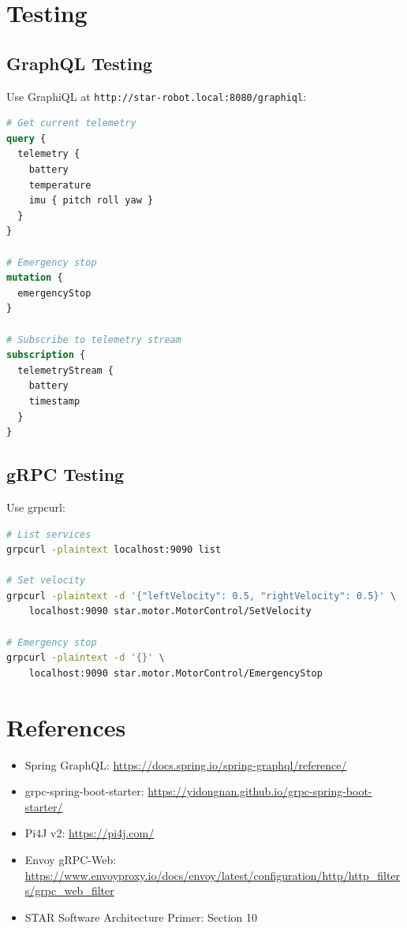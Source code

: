 \section{Testing}

\subsection{GraphQL Testing}

Use GraphiQL at \texttt{http://star-robot.local:8080/graphiql}:

\begin{lstlisting}[language=GraphQL, caption=Sample GraphQL Queries]
# Get current telemetry
query {
  telemetry {
    battery
    temperature
    imu { pitch roll yaw }
  }
}

# Emergency stop
mutation {
  emergencyStop
}

# Subscribe to telemetry stream
subscription {
  telemetryStream {
    battery
    timestamp
  }
}
\end{lstlisting}

\subsection{gRPC Testing}

Use grpcurl:

\begin{lstlisting}[language=bash]
# List services
grpcurl -plaintext localhost:9090 list

# Set velocity
grpcurl -plaintext -d '{"leftVelocity": 0.5, "rightVelocity": 0.5}' \
    localhost:9090 star.motor.MotorControl/SetVelocity

# Emergency stop
grpcurl -plaintext -d '{}' \
    localhost:9090 star.motor.MotorControl/EmergencyStop
\end{lstlisting}

\section{References}

\begin{itemize}
    \item Spring GraphQL: \url{https://docs.spring.io/spring-graphql/reference/}
    \item grpc-spring-boot-starter: \url{https://yidongnan.github.io/grpc-spring-boot-starter/}
    \item Pi4J v2: \url{https://pi4j.com/}
    \item Envoy gRPC-Web: \url{https://www.envoyproxy.io/docs/envoy/latest/configuration/http/http_filters/grpc_web_filter}
    \item STAR Software Architecture Primer: Section 10
\end{itemize}

